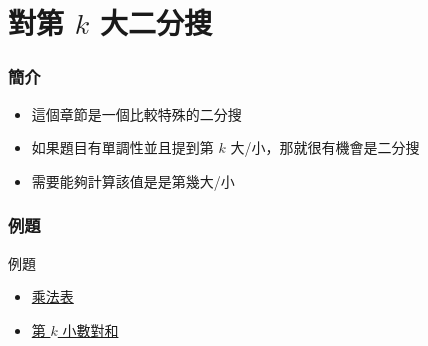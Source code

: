 \documentclass[mathserif]{beamer}
\begin{document}
\section{對第 $k$ 大二分搜}

\begin{frame}
    \frametitle{簡介}
    \begin{itemize}
        \item 這個章節是一個比較特殊的二分搜
        \item 如果題目有單調性並且提到第 $k$ 大/小，那就很有機會是二分搜
        \item 需要能夠計算該值是是第幾大/小
    \end{itemize}
\end{frame}

\begin{frame}
    \frametitle{例題}
    \begin{block}{例題}
        \begin{itemize}
            \item \href{https://cses.fi/problemset/task/2422}{乘法表}
            \item \href{https://codeforces.com/edu/course/2/lesson/6/5/practice/contest/285084/problem/C}{第 $k$ 小數對和}
        \end{itemize}
    \end{block}
\end{frame}
\end{document}
